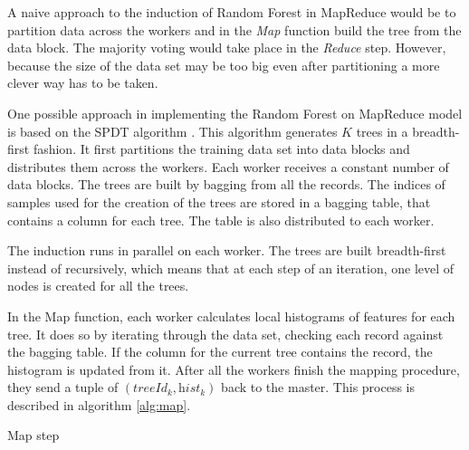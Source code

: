 \documentclass[thesis=B,english]{FITthesis}[2012/10/20]
\begin{document}
	A naive approach to the induction of Random Forest in MapReduce would be to partition data across the workers and in the \emph{Map} function build the tree from the data block. The majority voting would take place in the \emph{Reduce} step. However, because the size of the data set may be too big even after partitioning a more clever way has to be taken.
	
	One possible approach \cite{SCALABLE_RDF} in implementing the Random Forest on MapReduce model is based on the SPDT algorithm \cite{ben2010streaming}. This algorithm generates \(K\) trees in a breadth-first fashion. It first partitions the training data set into data blocks and distributes them across the workers. Each worker receives a constant number of data blocks. The trees are built by bagging from all the records. The indices of samples used for the creation of the trees are stored in a bagging table, that contains a column for each tree. The table is also distributed to each worker.

	The induction runs in parallel on each worker. The trees are built breadth-first instead of recursively, which means that at each step of an iteration, one level of nodes is created for all the trees. 

	In the Map function, each worker calculates local histograms of features for each tree. It does so by iterating through the data set, checking each record against the bagging table. If the column for the current tree contains the record, the histogram is updated from it. After all the workers finish the mapping procedure, they send a tuple of \((\textit{treeId}_k, \textit{hist}_k)\) back to the master. This process is described in algorithm \ref{alg:map}.

	\begin{algorithm}[t]
	\caption{Map step}
	\label{alg:map}
	\end{algorithm} 
\end{document}
